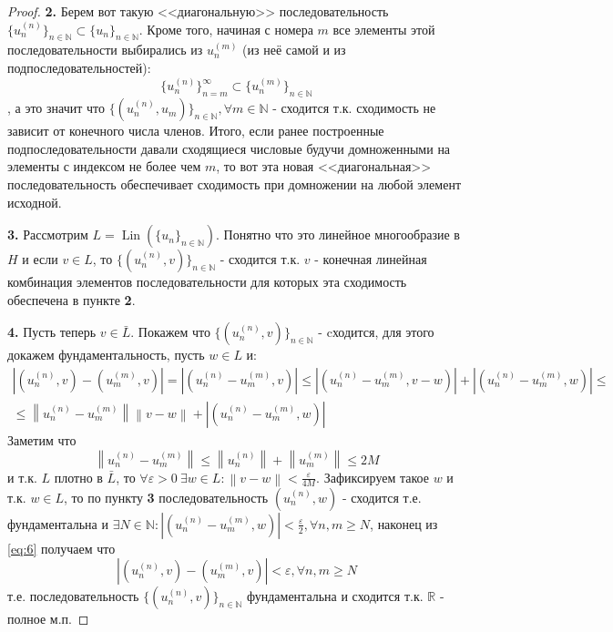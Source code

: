 \documentclass[12pt,a4paper]{article}
\theoremstyle{definition}
\newcommand{\Real}{\mathbb{R}}
\newcommand{\Natural}{\mathbb{N}}
\newcommand{\norm}[1]{\left\lVert#1\right\rVert}
\DeclareMathOperator{\Lin}{Lin}
\newcommand{\seq}[2]{\{#1\}_{#2}}
\newcommand{\seqbound}[3]{\{#1\}_{#2}^{#3}}
\begin{document}
\begin{proof}
	\textbf{2.} Берем вот такую <<диагональную>> последовательность $\seq{u_n^{(n)}}{n\in\Natural} \subset \seq{u_n}{n\in\Natural}$. Кроме того, начиная с номера $m$ все элементы этой последовательности выбирались из ${u_n^{(m)}}$ (из неё самой и из подпоследовательностей):
	\begin{equation*}
		\seqbound{u_n^{(n)}}{n=m}{\infty} \subset \seq{u_n^{(m)}}{n\in\Natural}
	\end{equation*}
	, а это значит что $\seq{(u_n^{(n)}, u_m)}{n\in\Natural}, \forall m \in \Natural$ - сходится т.к. сходимость не зависит от конечного числа членов. Итого, если ранее построенные подпоследовательности давали сходящиеся числовые будучи домноженными на элементы с индексом не более чем $m$, то вот эта новая <<диагональная>> последовательность обеспечивает сходимость при домножении на любой элемент исходной.
	
	\textbf{3.} Рассмотрим $L = \Lin(\seq{u_n}{n\in\Natural})$. Понятно что это линейное многообразие в $H$ и если $v \in L$, то $\seq{(u_n^{(n)}, v)}{n\in\Natural} \text{ - сходится}$ т.к. $v$ - конечная линейная комбинация элементов последовательности для которых эта сходимость обеспечена в пункте \textbf{2}. 
	
	\textbf{4.} Пусть теперь $v \in \bar{L}$. Покажем что $\seq{(u_n^{(n)}, v)}{n\in\Natural} \text{ - cходится}$, для этого докажем фундаментальность, пусть $w \in L$ и:
	\begin{multline}\label{eq:6}
		|(u_n^{(n)}, v) - (u_m^{(m)}, v)| = |(u_n^{(n)} - u_m^{(m)}, v)| \leq |(u_n^{(n)} - u_m^{(m)}, v - w)| + |(u_n^{(n)} - u_m^{(m)}, w)| \leq \\ \leq \norm{u_n^{(n)} - u_m^{(m)}}\norm{v - w} + |(u_n^{(n)} - u_m^{(m)}, w)|
	\end{multline}
	Заметим что 
	$$\norm{u_n^{(n)} - u_m^{(m)}} \leq \norm{u_n^{(n)}} + \norm{u_m^{(m)}} \leq 2M$$
	и т.к. $L$ плотно в $\bar{L}$, то $\forall \varepsilon > 0 \ \exists w \in L: \norm{v - w} < \frac{\varepsilon}{4M}$. Зафиксируем такое $w$ и т.к. $w\in L$, то по пункту \textbf{3} последовательность $(u_n^{(n)}, w)$ - сходится т.е. фундаментальна и $\exists N \in \Natural: |(u_n^{(n)} - u_m^{(m)}, w)| < \frac{\varepsilon}{2}, \forall n, m \geq N$, наконец из \eqref{eq:6} получаем что
	\begin{equation*}
		|(u_n^{(n)}, v) - (u_m^{(m)}, v)| < \varepsilon, \forall n,m \geq N
	\end{equation*}
	т.е. последовательность $\seq{(u_n^{(n)}, v)}{n\in\Natural}$ фундаментальна и сходится т.к. $\Real$ - полное м.п.
	

\end{proof}
\end{document}
